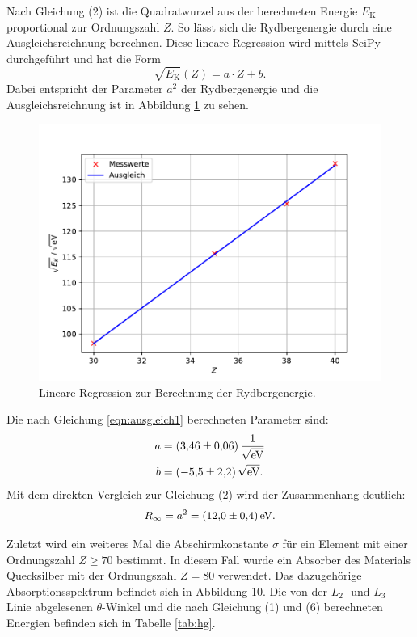\noindent Nach Gleichung (2) ist die Quadratwurzel aus der berechneten Energie $E_\text{K}$ proportional zur Ordnungszahl $Z$. So lässt sich die
Rydbergenergie durch eine Ausgleichsreichnung berechnen. Diese lineare Regression wird mittels SciPy durchgeführt und hat die Form
\begin{equation}
\label{eqn:ausgleich1}
  \sqrt{E_\text{K}}(Z) = a \cdot Z + b.
\end{equation}
Dabei entspricht der Parameter $a^2$ der Rydbergenergie und die Ausgleichsreichnung ist in Abbildung \ref{fig:ausgleich} zu sehen.
\begin{figure}[H]
  \center
  \includegraphics[scale = 0.75]{rydberg.pdf}
  \caption{Lineare Regression zur Berechnung der Rydbergenergie.}
  \label{fig:ausgleich}
\end{figure}
\noindent Die nach Gleichung \eqref{eqn:ausgleich1} berechneten Parameter sind:
\begin{align*}
a &= (\num{3.46 +- 0.06})\,\frac{1}{\sqrt{\si{\electronvolt}}} \\
b &= (\num{-5.5 +- 2.2})\,\sqrt{\si{\electronvolt}}.
\end{align*}
Mit dem direkten Vergleich zur Gleichung (2) wird der Zusammenhang deutlich:
\begin{align*}
R_\infty = a^2 = (\num{12.0 +- 0.4})\,\si{\electronvolt}.
\end{align*}

Zuletzt wird ein weiteres Mal die Abschirmkonstante $\sigma$ für ein Element mit einer Ordnungszahl $Z \geq 70$ bestimmt. In diesem Fall wurde ein Absorber des Materials
Quecksilber mit der Ordnungszahl $Z = 80$ verwendet. Das dazugehörige Absorptionsspektrum befindet sich in Abbildung 10. Die von der $L_2$- und $L_3$-Linie abgelesenen $\theta$-Winkel
und die nach Gleichung (1) und (6) berechneten Energien befinden sich in Tabelle \ref{tab:hg}.

